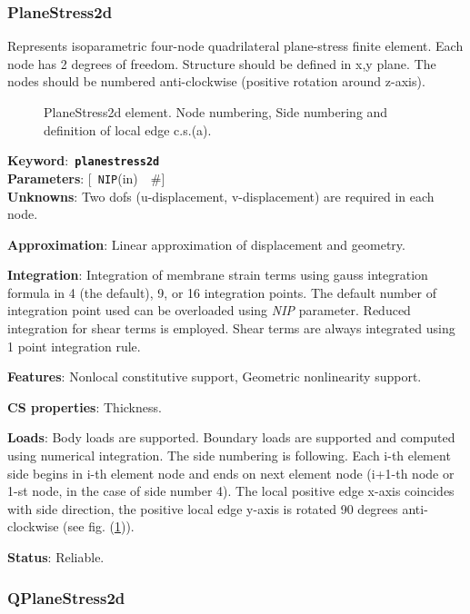 \documentclass[a4paper]{article}
\newcommand{\descitem}[1]{{\noindent \bf #1}:}
\newcommand{\elemkeyword}[1]{\descitem{Keyword}~{\bf \texttt{#1}}}
\newcommand{\elemparam}[2]{{{\texttt{#1}\tiny (#2)}~~\#}}
\newcommand{\optelemparam}[2]{{[~\elemparam{#1}{#2}]}}
\newcommand{\param}[1]{{\em #1}}
\begin{document}
\subsubsection{PlaneStress2d}
Represents isoparametric four-node quadrilateral plane-stress
finite element. Each node has 2 degrees of freedom.
Structure should be defined in x,y plane. 
The nodes should be numbered anti-clockwise (positive rotation around
z-axis). 

\begin{figure}[tb]
 \centering
 \begin{makeimage}
  
 \end{makeimage}
 \caption{PlaneStress2d element. Node numbering, Side numbering and
 definition of local edge c.s.(a).}
 \label{Planestress2dfig}
\end{figure}

\elemkeyword{planestress2d}\\
\descitem{Parameters} \optelemparam{NIP}{in}\\
\descitem{Unknowns}
Two dofs (u-displacement, v-displacement) are required in each node.

\descitem{Approximation} Linear approximation of displacement and
geometry.

\descitem{Integration}
Integration of membrane strain terms using gauss integration formula
in 4 (the default), 9, or 16 integration points. The default number of
integration point used can be overloaded using \param{NIP} parameter.
Reduced integration for shear terms is employed. Shear terms are
always integrated using 1 point integration rule.

\descitem{Features} Nonlocal constitutive support, Geometric nonlinearity support.

\descitem{CS properties} Thickness. 

\descitem{Loads} Body loads are supported. Boundary loads are
supported and computed using numerical integration. The side numbering is
following. Each i-th element side begins in i-th element node and
ends on next element node (i+1-th node or 1-st node, in the case of 
side number 4). The local positive edge x-axis coincides with side
direction, the positive local edge y-axis is rotated 90 degrees
anti-clockwise (see fig. (\ref{Planestress2dfig})).

\descitem{Status} Reliable.

\subsubsection{QPlaneStress2d}
\end{document}
